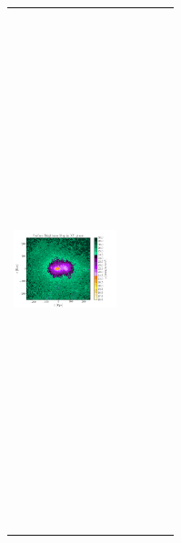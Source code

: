 \begin{tabular}{c c c c c}
  {\includegraphics[height=15cm,width=3cm,trim={15.5cm 1.cm 0cm 1.cm},clip]{../pngs/D8.png}}
 \\


\end{tabular}
